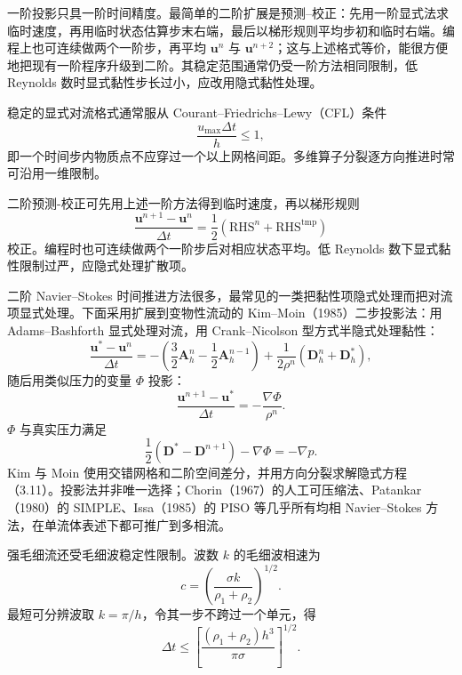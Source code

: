 \documentclass[11pt,a4paper,openany,fontset=none]{ctexbook}
\begin{document}
一阶投影只具一阶时间精度。最简单的二阶扩展是预测--校正：先用一阶显式法求临时速度，再用临时状态估算步末右端，最后以梯形规则平均步初和临时右端。编程上也可连续做两个一阶步，再平均 $\bm u^n$ 与 $\bm u^{n+2}$；这与上述格式等价，能很方便地把现有一阶程序升级到二阶。其稳定范围通常仍受一阶方法相同限制，低 Reynolds 数时显式黏性步长过小，应改用隐式黏性处理。

稳定的显式对流格式通常服从 Courant--Friedrichs--Lewy（CFL）条件
\begin{equation}
 \frac{u_{\max}\Delta t}{h}\le1, \tag{3.9}
\end{equation}
即一个时间步内物质点不应穿过一个以上网格间距。多维算子分裂逐方向推进时常可沿用一维限制。

二阶预测-校正可先用上述一阶方法得到临时速度，再以梯形规则
\begin{equation}
 \frac{\bm u^{n+1}-\bm u^n}{\Delta t}=\frac12(\mathrm{RHS}^n+\mathrm{RHS}^{\mathrm{tmp}}) \tag{3.10}
\end{equation}
校正。编程时也可连续做两个一阶步后对相应状态平均。低 Reynolds 数下显式黏性限制过严，应隐式处理扩散项。

二阶 Navier--Stokes 时间推进方法很多，最常见的一类把黏性项隐式处理而把对流项显式处理。下面采用扩展到变物性流动的 Kim--Moin（1985）二步投影法：用 Adams--Bashforth 显式处理对流，用 Crank--Nicolson 型方式半隐式处理黏性：
\begin{equation}
 \frac{\bm u^*-\bm u^n}{\Delta t}
 =-\left(\frac32\bm A_h^n-\frac12\bm A_h^{n-1}\right)
 +\frac1{2\rho^n}(\bm D_h^n+\bm D_h^*), \tag{3.11}
\end{equation}
随后用类似压力的变量 $\Phi$ 投影：
\begin{equation}
 \frac{\bm u^{n+1}-\bm u^*}{\Delta t}=-\frac{\nabla\Phi}{\rho^n}. \tag{3.12}
\end{equation}
$\Phi$ 与真实压力满足
\begin{equation}
 \frac12(\bm D^*-\bm D^{n+1})-\nabla\Phi=-\nabla p. \tag{3.13}
\end{equation}
Kim 与 Moin 使用交错网格和二阶空间差分，并用方向分裂求解隐式方程（3.11）。投影法并非唯一选择；Chorin（1967）的人工可压缩法、Patankar（1980）的 SIMPLE、Issa（1985）的 PISO 等几乎所有均相 Navier--Stokes 方法，在单流体表述下都可推广到多相流。

强毛细流还受毛细波稳定性限制。波数 $k$ 的毛细波相速为
\begin{equation}
 c=\left(\frac{\sigma k}{\rho_1+\rho_2}\right)^{1/2}. \tag{3.14}
\end{equation}
最短可分辨波取 $k=\pi/h$，令其一步不跨过一个单元，得
\begin{equation}
 \Delta t\le\left[\frac{(\rho_1+\rho_2)h^3}{\pi\sigma}\right]^{1/2}. \tag{3.15}
\end{equation}
\end{document}
